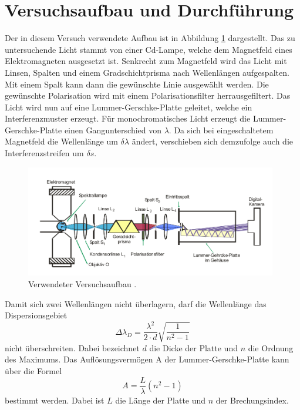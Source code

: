 \section{Versuchsaufbau und Durchführung}
\label{sec:Durchführung}

Der in diesem Versuch verwendete Aufbau ist in Abbildung \ref{fig:Aufbau} dargestellt. Das
zu untersuchende Licht stammt von einer Cd-Lampe, welche dem Magnetfeld eines Elektromagneten
ausgesetzt ist. Senkrecht zum Magnetfeld wird das Licht mit Linsen, Spalten und einem
Gradschichtprisma nach Wellenlängen aufgespalten. Mit einem Spalt kann dann die gewünschte Linie
ausgewählt werden. Die gewünschte Polarisation wird mit einem Polarisationsfilter herrausgefiltert.
Das Licht wird nun auf eine Lummer-Gerschke-Platte geleitet, welche ein Interferenzmuster erzeugt.
Für monochromatisches Licht erzeugt die Lummer-Gerschke-Platte einen Gangunterschied von $\lambda$.
Da sich bei eingeschaltetem Magnetfeld die Wellenlänge um $\delta \lambda$ ändert, verschieben sich
demzufolge auch die Interferenzstreifen um $\delta s$.
\begin{figure}
  \centering
  \includegraphics[width=11cm]{Aufbau.png}
  \caption{Verwendeter Versuchsaufbau \cite{skript}.}
  \label{fig:Aufbau}
\end{figure}

Damit sich zwei Wellenlängen nicht überlagern, darf die Wellenlänge
das Dispersionsgebiet
\begin{equation}
  \Delta\lambda_D=\frac{\lambda^2}{2\cdot d}\sqrt{\frac{1}{n^2-1}}
  \label{eqn:dispersion}
\end{equation}
nicht überschreiten. Dabei bezeichnet $d$ die Dicke der Platte und
$n$ die Ordnung des Maximums.
Das Auflösungsvermögen A der Lummer-Gerschke-Platte kann über die Formel
\begin{equation}
  A=\frac{L}{\lambda}(n^2-1)
  \label{eqn:Auflösung}
\end{equation}
bestimmt werden. Dabei ist $L$ die Länge der Platte und $n$ der Brechungsindex.

